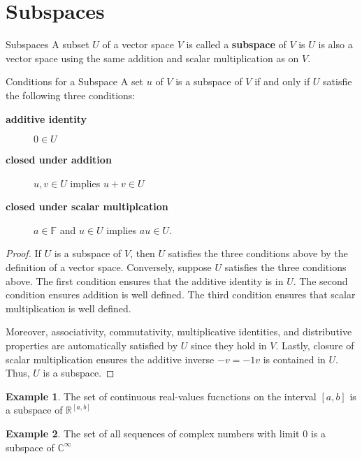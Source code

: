 \documentclass{book}
\newcommand{\real}{\mathbb{R}}
\newcommand{\complex}{\mathbb{C}}
\newcommand{\field}{\mathbb{F}}
\theoremstyle{definition}
\newtheorem*{example}{Example}
\begin{document}
\section{Subspaces}
\begin{definition}{Subspaces}
    A subset $U$ of a vector space $V$ is called a \textbf{subspace} of $V$ is
    $U$ is also a vector space using the same addition and scalar multiplication
    as on $V$.
\end{definition}

\begin{thm}{Conditions for a Subspace}
    A set $u$ of $V$ is a subspace of $V$ if and only if $U$ satisfie the
    following three conditions:
    \begin{description}
        \item[ \textbf{additive identity}] $0\in U$ 
        \item[ \textbf{closed under addition}] $u,v\in U$ implies $u+v\in U$ 
        \item[ \textbf{closed under scalar multiplcation}] $a\in\field$ and
            $u\in U$ implies $au\in U$.
    \end{description}
\end{thm}

\begin{proof}
    If $U$ is a subspace of $V$, then $U$ satisfies the three conditions above
    by the definition of a vector space. Conversely, suppose $U$ satisfies the
    three conditions above. The first condition ensures that the additive
    identity is in $U$. The second condition ensures addition is well defined.
    The third condition ensures that scalar multiplication is well defined.

    Moreover, associativity, commutativity, multiplicative identities, and
    distributive properties are automatically satisfied by $U$ since they hold
    in $V$. Lastly, closure of scalar multiplication ensures the additive
    inverse $-v = -1v$ is contained in $U$. Thus, $U$ is a subspace. 
\end{proof}

\begin{example}
    The set of continuous real-values fucnctions on the interval $[a,b]$ is a
    subspace of $\real^{[a,b]}$ 
\end{example}

\begin{example}
    The set of all sequences of complex numbers with limit 0 is a subspace of
    $\complex^{\infty}$
\end{example}
\end{document}
